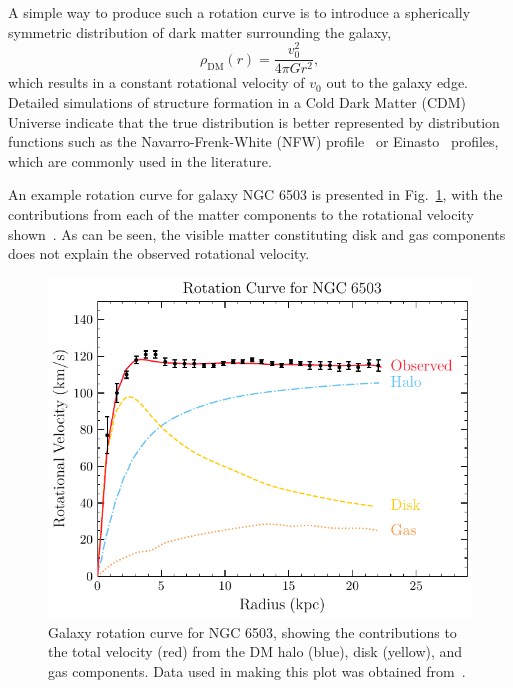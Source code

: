 A simple way to produce such a rotation curve is to introduce a spherically symmetric distribution of dark matter surrounding the galaxy,
\begin{equation}
    \rho_{\mathrm{DM}}(r) = \frac{v_0^2}{4 \pi G r^2},
\end{equation}
which results in a constant rotational velocity of $v_0$ out to the galaxy edge. Detailed simulations of structure formation in a Cold Dark Matter (CDM) Universe indicate that the true distribution is better represented by distribution functions such as the Navarro-Frenk-White (NFW) profile~\cite{Navarro:1995iw_StructureColdDark, Navarro:1996gj_UniversalDensityProfile} or Einasto~\cite{Einasto_jan_ConstructionCompositeModel} profiles, which are commonly used in the literature.

An example rotation curve for galaxy NGC 6503 is presented in Fig.~\ref{ch1:fig:gal_rotn_curve}, with the contributions from each of the matter components to the rotational velocity shown~\cite{Freese:2008cz_may_ReviewObservationalEvidence, Lelli:2016zqa_SPARCMassModels}. As can be seen, the visible matter constituting disk and gas components does not explain the observed rotational velocity. 

\begin{figure}[t!]
    \centering
    \includegraphics{gal_rotn_N6503}
    \caption[Galaxy rotation curve for NGC 6503.]{Galaxy rotation curve for NGC 6503, showing the contributions to the total velocity (red) from the DM halo (blue), disk (yellow), and gas components. Data used in making this plot was obtained from~\cite{Freese:2008cz_may_ReviewObservationalEvidence, Lelli:2016zqa_SPARCMassModels}.}
    \label{ch1:fig:gal_rotn_curve}
\end{figure}

